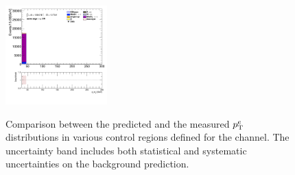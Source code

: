 \begin{figure}[!htp]
\begin{center}
			\includegraphics[width=0.35\textwidth]{chapters/chapter6_HPlus/images/taulep/el_0_pt_SS_TAUMU.png} \\
			\end{center}
			\caption{
			Comparison between the predicted and the measured $p_{\text{T}}^{e}$ distributions in various control regions defined for the \taulep channel. The uncertainty band includes both statistical and systematic uncertainties on the background prediction. 
			}
			\label{fig:bkg-pt-el-taulep}
		\end{figure}

